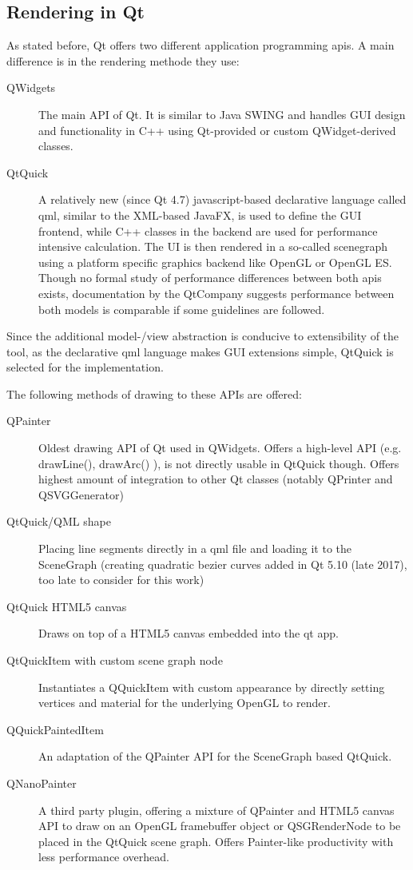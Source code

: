 \subsection{Rendering in Qt}
\label{sec:qtrender}
As stated before, Qt offers two different application programming \gls{api}s. A main difference is in the rendering methode they use:
\begin{description}
	\item [QWidgets] The main API of Qt. It is similar to Java SWING and handles GUI design and functionality in C++ using Qt-provided or custom QWidget-derived classes.
	\item [QtQuick] A relatively new (since Qt 4.7) javascript-based declarative language called \gls{qml}, similar to the XML-based JavaFX, is used to define the GUI frontend, while C++ classes in the backend are used for performance intensive calculation. The UI is then rendered in a so-called scenegraph using a platform specific graphics backend like OpenGL or OpenGL ES. Though no formal study of performance differences between both \gls{api}s exists, documentation by the QtCompany suggests performance between both models is comparable if some guidelines are followed.
\end{description}

Since the additional model-/view abstraction is conducive to extensibility of the tool, as the declarative \gls{qml} language makes GUI extensions simple, QtQuick is selected for the implementation.


The following methods of drawing to these APIs are offered:
\begin{description}
	\item [QPainter] Oldest drawing API of Qt used in QWidgets. Offers a high-level API (e.g. drawLine(), drawArc() ), is not directly usable in QtQuick though. Offers highest amount of integration to other Qt classes (notably QPrinter and QSVGGenerator)
	\item [QtQuick/QML shape] Placing line segments directly in a \gls{qml} file and loading it to the SceneGraph (creating quadratic bezier curves added in Qt 5.10 (late 2017), too late to consider for this work)
	\item [QtQuick HTML5 canvas] Draws on top of a HTML5 canvas embedded into the qt app.
	\item [QtQuickItem with custom scene graph node] Instantiates a QQuickItem with custom appearance by directly setting vertices and material for the underlying OpenGL to render.
	\item [QQuickPaintedItem] An adaptation of the QPainter API for the SceneGraph based QtQuick. 
	\item [QNanoPainter] A third party plugin, offering a mixture of QPainter and HTML5 canvas API to draw on an OpenGL framebuffer object or QSGRenderNode to be placed in the QtQuick scene graph. Offers Painter-like productivity with less performance overhead.
\end{description}

